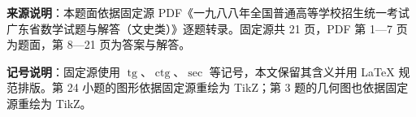 


\begin{gktip}
\textbf{来源说明}：本题面依据固定源 PDF《一九八八年全国普通高等学校招生统一考试广东省数学试题与解答（文史类）》逐题转录。固定源共 21 页，PDF 第 1—7 页为题面，第 8—21 页为答案与解答。

\textbf{记号说明}：固定源使用 $\operatorname{tg}$、$\operatorname{ctg}$、$\operatorname{sec}$ 等记号，本文保留其含义并用 LaTeX 规范排版。第 24 小题的图形依据固定源重绘为 TikZ；第 3 题的几何图也依据固定源重绘为 TikZ。
\end{gktip}

\Needspace{0.4\textheight}

